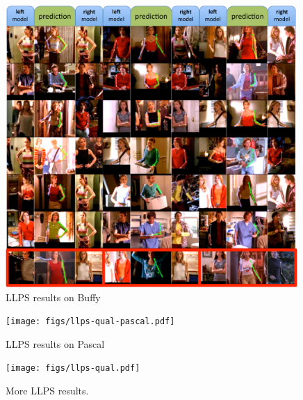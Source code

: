 \begin{figure}[tb]
\begin{center}
\includegraphics[width=0.99\textwidth]{figs/llps-qual-buffy.pdf}
\caption[LLPS results on Buffy]{LLPS results on Buffy}
\label{fig:llps1}
\end{center}
\end{figure}

\begin{figure}[tb]
\begin{center}
\texttt{[image: figs/llps-qual-pascal.pdf]}
\caption[LLPS results on Pascal]{LLPS results on Pascal}
\label{fig:llps2}
\end{center}
\end{figure}

\begin{figure}[tb]
\begin{center}
\texttt{[image: figs/llps-qual.pdf]}
\caption[More LLPS results.]{More LLPS results.}
\label{fig:llps3}
\end{center}
\end{figure}



